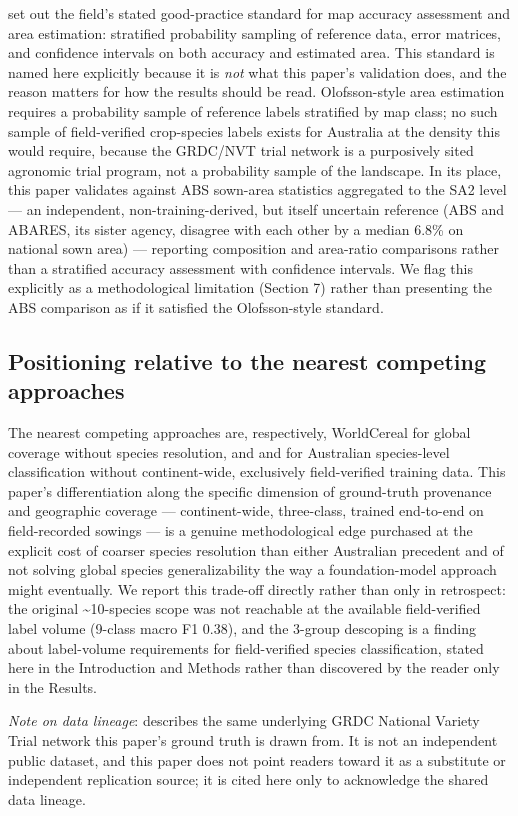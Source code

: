 \citet{olofsson2014goodpractices} set out the field's stated good-practice standard for map accuracy assessment and area estimation: stratified probability sampling of reference data, error matrices, and confidence intervals on both accuracy and estimated area. This standard is named here explicitly because it is \emph{not} what this paper's validation does, and the reason matters for how the results should be read. Olofsson-style area estimation requires a probability sample of reference labels stratified by map class; no such sample of field-verified crop-species labels exists for Australia at the density this would require, because the GRDC/NVT trial network is a purposively sited agronomic trial program, not a probability sample of the landscape. In its place, this paper validates against ABS sown-area statistics aggregated to the SA2 level --- an independent, non-training-derived, but itself uncertain reference (ABS and ABARES, its sister agency, disagree with each other by a median 6.8\% on national sown area) --- reporting composition and area-ratio comparisons rather than a stratified accuracy assessment with confidence intervals. We flag this explicitly as a methodological limitation (Section 7) rather than presenting the ABS comparison as if it satisfied the Olofsson-style standard.

\subsection{Positioning relative to the nearest competing approaches}\label{positioning-relative-to-the-nearest-competing-approaches}

The nearest competing approaches are, respectively, WorldCereal for global coverage without species resolution, and \citet{sharma2026wa} and \citet{alshammari2024mdb} for Australian species-level classification without continent-wide, exclusively field-verified training data. This paper's differentiation along the specific dimension of ground-truth provenance and geographic coverage --- continent-wide, three-class, trained end-to-end on field-recorded sowings --- is a genuine methodological edge purchased at the explicit cost of coarser species resolution than either Australian precedent and of not solving global species generalizability the way a foundation-model approach might eventually. We report this trade-off directly rather than only in retrospect: the original \textasciitilde10-species scope was not reachable at the available field-verified label volume (9-class macro F1 0.38), and the 3-group descoping is a finding about label-volume requirements for field-verified species classification, stated here in the Introduction and Methods rather than discovered by the reader only in the Results.

\emph{Note on data lineage}: \citet{newmanfurbank2021} describes the same underlying GRDC National Variety Trial network this paper's ground truth is drawn from. It is not an independent public dataset, and this paper does not point readers toward it as a substitute or independent replication source; it is cited here only to acknowledge the shared data lineage.
